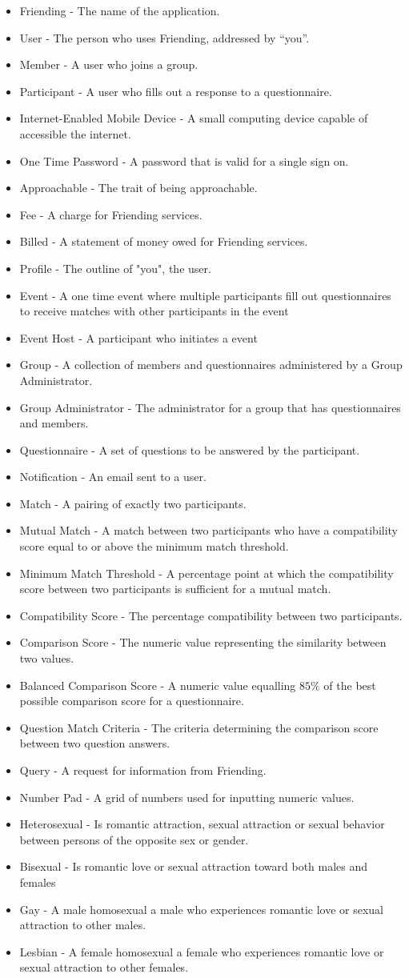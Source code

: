 \documentclass[a4paper,11pt,titlepage]{scrartcl}
\newcommand{\textapp}[1]{{\fontfamily{cmss}\selectfont#1}}
\newcommand{\Friending}{\textapp{Friending}}
\newcommand{\gterm}[2]{\item #1 - #2}
\begin{document}
\begin{itemize}
\gterm{\Friending{}}{The name of the application.}
\gterm{User}{The person who uses \Friending{}, addressed by “you”.}
\gterm{Member}{A user who joins a group.}
\gterm{Participant}{A user who fills out a response to a questionnaire.}

\gterm{Internet-Enabled Mobile Device}{A small computing device capable of accessible the internet.}
\gterm{One Time Password}{A password that is valid for a single sign on.}
\gterm{Approachable}{The trait of being approachable.}

\gterm{Fee}{A charge for \Friending{} services.}
\gterm{Billed}{A statement of money owed for \Friending{} services.}

\gterm{Profile}{The outline of "you", the user.}
\gterm{Event}{A one time event where multiple participants fill out questionnaires to receive matches with other participants in the event}
\gterm{Event Host}{A participant who initiates a event}
\gterm{Group}{A collection of members and questionnaires administered by a Group Administrator.}
\gterm{Group Administrator}{The administrator for a group that has questionnaires and members.}
\gterm{Questionnaire}{A set of questions to be answered by the participant.}
\gterm{Notification}{An email sent to a user.}

\gterm{Match}{A pairing of exactly two participants.}
\gterm{Mutual Match}{A match between two participants who have a compatibility score equal to or above the minimum match threshold.} 
\gterm{Minimum Match Threshold}{A percentage point at which the compatibility score between two participants is sufficient for a mutual match.}
\gterm{Compatibility Score}{The percentage compatibility between two participants.}
\gterm{Comparison Score}{The numeric value representing the similarity between two values.}
\gterm{Balanced Comparison Score}{A numeric value equalling $85\%$ of the best possible comparison score for a questionnaire.}
\gterm{Question Match Criteria}{The criteria determining the comparison score between two question answers.}

\gterm{Query}{A request for information from \Friending{}.}

\gterm{Number Pad}{A grid of numbers used for inputting numeric values.}

\gterm{Heterosexual}{Is romantic attraction, sexual attraction or sexual behavior between persons of the opposite sex or gender.}
\gterm{Bisexual}{Is romantic love or sexual attraction toward both males and females}
\gterm{Gay}{A male homosexual a male who experiences romantic love or sexual attraction to other males.}
\gterm{Lesbian}{A female homosexual a female who experiences romantic love or sexual attraction to other females.}
\end{itemize}
\end{document}
